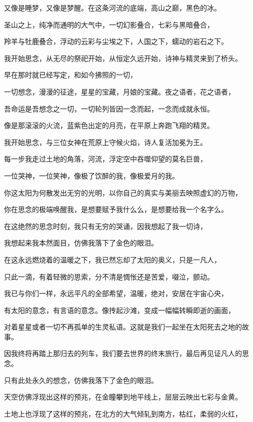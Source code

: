 \documentclass[UTF8]{article}
\begin{document}
\par 又像是睡梦，又像是梦醒。在这条河流的底端，高山之巅，黑色的冰。
\par 圣山之上，纯净而通明的大气中，一切幻影叠合，七彩与黑暗叠合，
\par 羚羊与牡鹿叠合，浮动的云彩与尘埃之下，人国之下，蠕动的岩石之下。
\par 我开始思念，从无尽的祭祀开始，从恒定久远开始，诗神与精灵来到了桥头。
\par 早在那时就已经写定，和如今拂照的一切，
\par 一切想念，漫漫的征途，星星的宝藏，月娘的宝藏。夜之语者，花之语者，
\par 吾命运是吾想念之一切，一切轮列皆因一念而起，一念而成就永恒。
\par 像是那滚滚的火流，蓝紫色出定的月亮，在平原上奔跑飞翔的精灵。
\par 我开始思念，与三位女神在荒原上守候火焰，诗人复活加冕为王。
\par 每一步我走过土地的角落，河流，浮定空中吞噬仰望的莫名巨兽，
\par 一位哭神，一位笑神，像极了饮醉的我，像极爱月的我。
\par 你这太阳为何散发出无穷的光明，以你自己的真实与美丽去映照虚幻的万物，
\par 你在思念的极端唤醒我，是想要赋予我什么么，是想要给我一个名字么。
\par 在这绝然的思念时刻，我只有无穷的哭诵，因我想起了我一切诗，
\par 我想起来我本然面目，仿佛我落下了金色的眼泪。
\par 在这永远燃烧着的温暖之下，我已然忘却了太阳的奥义，只是一凡人，
\par 只此一滴，有着轻微的思索，分不清是惆怅还是苦爱，啜泣，颤动。
\par 我已与你们一样，永远平凡的全部希望，温暖，绝对，安居在宇宙心央，
\par 有太阳的意念，有言语的意念。像抟起沙滩，变成一幅幅转瞬即逝的画面，
\par 对着星星或者一切不再孤单的生灵私语。这就是我们一起坐在太阳死去之地的故事。
\par 因我终将再踏上那归去的列车，我们要去世界的终末旅行，最后再见证凡人的思念。
\par 只有此处永久的想念，仿佛我落下了金色的眼泪。
\\[0.6cm]
\par 天空仿佛浮现出这样的预兆，在金瞳攀到地平线上，层层云映出七彩与金黄。
\par 土地上也浮现了这样的预兆，在北方的大气倾轧到南方，枯红，柔弱的火红，
\end{document}
